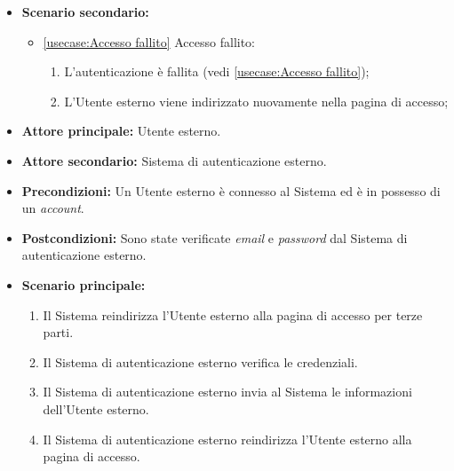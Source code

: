 \begin{itemize}
	\item \textbf{Scenario secondario:}
	\begin{itemize}
		\item \autoref{usecase:Accesso fallito} Accesso fallito:
		\begin{enumerate}
			\item L'autenticazione è fallita (vedi \autoref{usecase:Accesso fallito});
			\item L'Utente esterno viene indirizzato nuovamente nella pagina di accesso; 
		\end{enumerate}	
	\end{itemize}

		

\end{itemize}

\label{usecase:Accesso per terze parti}
\begin{itemize}

	\item \textbf{Attore principale:} Utente esterno.
	\item \textbf{Attore secondario:} Sistema di autenticazione esterno.

	\item \textbf{Precondizioni:} Un Utente esterno è connesso al Sistema ed è in possesso di un \textit{account}.

	\item \textbf{Postcondizioni:} Sono state verificate \textit{email} e \textit{password} dal Sistema di autenticazione esterno.

	\item \textbf{Scenario principale:}
	\begin{enumerate}
		\item Il Sistema reindirizza l'Utente esterno alla pagina di accesso per terze parti.
		\item Il Sistema di autenticazione esterno verifica le credenziali.
		\item Il Sistema di autenticazione esterno invia al Sistema le informazioni dell'Utente esterno.
		\item Il Sistema di autenticazione esterno reindirizza l'Utente esterno alla pagina di accesso. 
	\end{enumerate}
	
\end{itemize}

